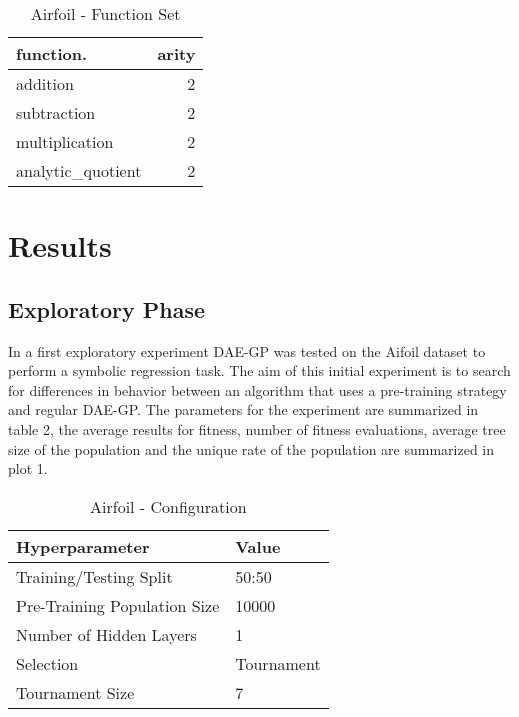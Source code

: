 \documentclass[
  11pt,
]{article}
\begin{document}
\begin{table}[!h]

\caption{\label{tab:airfoil_function_set}Airfoil - Function Set}
\centering
\begin{tabular}[t]{l|r}
\hline
\textbf{function.} & \textbf{arity}\\
\hline
addition & 2\\
\hline
subtraction & 2\\
\hline
multiplication & 2\\
\hline
analytic\_quotient & 2\\
\hline
\end{tabular}
\end{table}

\hypertarget{results}{%
\section{Results}\label{results}}

\hypertarget{exploratory-phase}{%
\subsection{Exploratory Phase}\label{exploratory-phase}}

In a first exploratory experiment DAE-GP was tested on the Aifoil
dataset to perform a symbolic regression task. The aim of this initial
experiment is to search for differences in behavior between an algorithm
that uses a pre-training strategy and regular DAE-GP. The parameters for
the experiment are summarized in table 2, the average results for
fitness, number of fitness evaluations, average tree size of the
population and the unique rate of the population are summarized in plot
1.

\begin{table}[!h]

\caption{\label{tab:unnamed-chunk-1}Airfoil - Configuration}
\centering
\begin{tabular}[t]{l|l}
\hline
\textbf{Hyperparameter} & \textbf{Value}\\
\hline
Training/Testing Split & 50:50\\
\hline
Pre-Training Population Size & 10000\\
\hline
Number of Hidden Layers & 1\\
\hline
Selection & Tournament\\
\hline
Tournament Size & 7\\
\hline
\end{tabular}
\end{table}
\end{document}
